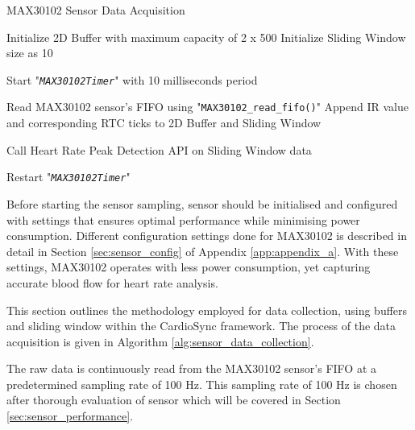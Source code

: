 \begin{algorithm}[t]
\caption{MAX30102 Sensor Data Acquisition}
\scriptsize
\label{alg:sensor_data_collection}
\begin{algorithmic}[1]

\State Initialize 2D Buffer with maximum capacity of 2 x 500
\State Initialize Sliding Window size as 10
\item[]
\State Start "\textit{\texttt{MAX30102Timer}}" with 10 milliseconds period 
\item[] 
    \State Read MAX30102 sensor's FIFO using "\texttt{MAX30102\_read\_fifo()}" 
    \State Append IR value and corresponding RTC ticks to 2D Buffer and Sliding Window
    \item[] 
        \State Call Heart Rate Peak Detection API on Sliding Window data 
    \EndIf
    \item[] 
    \State Restart "\textit{\texttt{MAX30102Timer}}"
\EndIf

\end{algorithmic}
\end{algorithm}

Before starting the sensor sampling, sensor should be initialised and configured with settings that ensures optimal performance while minimising power consumption. Different configuration settings done for MAX30102 is described in detail in Section \ref{sec:sensor_config} of Appendix \ref{app:appendix_a}. With these settings, MAX30102 operates with less power consumption, yet capturing accurate blood flow for heart rate analysis.
\vspace{1\baselineskip}

\noindent This section outlines the methodology employed for data collection, using buffers and sliding window within the CardioSync framework. The process of the data acquisition is given in Algorithm \ref{alg:sensor_data_collection}.
\vspace{1\baselineskip}

\noindent The raw data is continuously read from the MAX30102 sensor's FIFO at a predetermined sampling rate of 100 Hz. This sampling rate of 100 Hz is chosen after thorough evaluation of sensor which will be covered in Section \ref{sec:sensor_performance}. 
\vspace{1\baselineskip}

